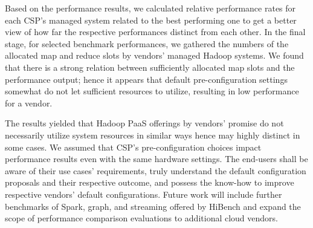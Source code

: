 \documentclass[review]{elsarticle}
\begin{document}
Based on the performance results, we calculated relative performance rates for each CSP's managed system related to the best performing one to get a better view of how far the respective performances distinct from each other. In the final stage, for selected benchmark performances, we gathered the numbers of the allocated map and reduce slots by vendors' managed Hadoop systems. We found that there is a strong relation between sufficiently allocated map slots and the performance output; hence it appears that default pre-configuration settings somewhat do not let sufficient resources to utilize, resulting in low performance for a vendor.

The results yielded that Hadoop PaaS offerings by vendors' promise do not necessarily utilize system resources in similar ways hence may highly distinct in some cases. We assumed that CSP's pre-configuration choices impact performance results even with the same hardware settings. The end-users shall be aware of their use cases' requirements, truly understand the default configuration proposals and their respective outcome, and possess the know-how to improve respective vendors' default configurations. %
Future work will include further benchmarks of Spark, graph, and streaming offered by HiBench and expand the scope of performance comparison evaluations to additional cloud vendors. %


\end{document}
